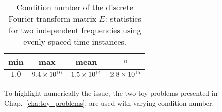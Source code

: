 \begin{table}[htb]
  \centering
  \begin{tabular}{cccc}
    \toprule
    min & max & mean & $\sigma$ \\
    \midrule
    $1.0$ & $9.4\times 10^{16}$ & $1.5\times 10^{14}$ & $2.8\times 10^{15}$ \\
    \bottomrule
  \end{tabular}
  \caption{Condition number of the discrete Fourier transform matrix $E$: 
  statistics for two independent frequencies using evenly spaced time instances.}
  \label{tab:hb_algo_equi}
\end{table} 

To highlight numerically the issue, the two toy problems
presented in Chap.~\ref{cha:toy_problems},
are used with varying condition number.
